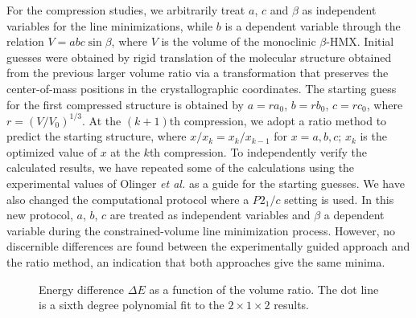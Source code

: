 \commentoutA{\documentclass[prl,aps,twocolumn,twocolumngrid,superbib]{revtex4}}
\begin{document}
For the compression studies, we arbitrarily treat $a$, $c$ and $\beta$
as independent variables for the line minimizations, while $b$ is a
dependent variable through the relation $V = abc \sin\beta$, where $V$
is the volume of the monoclinic $\beta$-HMX.  Initial guesses were
obtained by rigid translation of the molecular structure obtained from
the previous larger volume ratio via a transformation that preserves
the center-of-mass positions in the crystallographic coordinates.  The
starting guess for the first compressed structure is obtained by $a =
ra_0$, $b = r b_0$, $c = r c_0$, where $r = (V/V_0)^{1/3}$.  At the
$(k+1)$th compression, we adopt a ratio method to predict the starting
structure, where $x/x_{k} = x_{k}/x_{k-1}$ for $x = a, b, c$; $x_{k}$
is the optimized value of $x$ at the $k$th compression.  To
independently verify the calculated results, we have repeated some of
the calculations using the experimental values of Olinger {\it et
al.}\cite{BOlinger78} as a guide for the starting guesses.  We have
also changed the computational protocol where a $P2_{1}/c$ setting is
used.  In this new protocol, $a$, $b$, $c$ are treated as independent
variables and $\beta$ a dependent variable during the
constrained-volume line minimization process.  However, no discernible
differences are found between the experimentally guided approach and
the ratio method, an indication that both approaches give the same
minima.
\begin{figure}
\caption{
Energy difference $\Delta E$ as a function of the volume ratio. The
dot line is a sixth degree polynomial fit to the $2\times 1 \times 2$
results.
}
\label{fig:VRatio_Ediff}
\end{figure}
\end{document}
